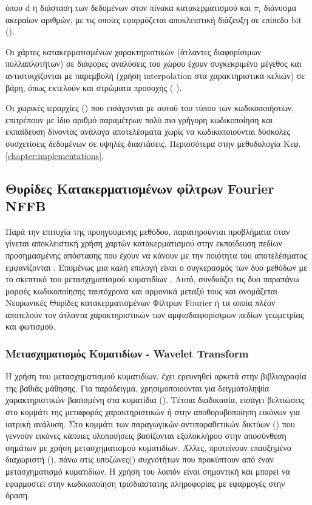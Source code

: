     όπου d η διάσταση των δεδομένων στον πίνακα κατακερματισμού και $\pi_i$ διάνυσμα ακεραίων αριθμών, με τις οποίες εφαρμόζεται αποκλειστική διάζευξη σε επίπεδο bit (). 
\par
    Οι χάρτες κατακερματισμένων χαρακτηριστικών (άτλαντες διαφορίσιμων πολλαπλοτήτων) σε διάφορες αναλύσεις του χώρου έχουν συγκεκριμένο μέγεθος και αντιστοιχίζονται με παρεμβολή (χρήση interpolation στα χαρακτηριστικά κελιών) σε βάρη, όπως εκτελούν και στρώματα προσοχής ( \cite{vaswani2023attention}).
\par 
    Οι χωρικές ιεραρχίες () που εισάγονται με αυτού του τύπου των κωδικοποιήσεων, επιτρέπουν με ίδιο αριθμό παραμέτρων πολύ πιο γρήγορη κωδικοποίηση και εκπαίδευση δίνοντας ανάλογα αποτελέσματα χωρίς να κωδικοποιούνται δύσκολες συσχετίσεις δεδομένων σε υψηλές διαστάσεις. Περισσότερα στην μεθοδολογία Κεφ.\ref{chapter:implementations}.

    
\subsection{ Θυρίδες Κατακερματισμένων φίλτρων Fourier NFFB \cite{wu2023neural}}
    Παρά την επιτυχία της προηγούμενης μεθόδου, παρατηρούνται προβλήματα όταν γίνεται αποκλειστική χρήση χαρτών κατακερματισμού στην εκπαίδευση πεδίων προσημασμένης απόστασης που έχουν να κάνουν με την ποιότητα του αποτελέσματος {εμφανίζονται }. Επομένως μια καλή επιλογή είναι ο συγκερασμός των δύο μεθόδων με το σκεπτικό του μετασχηματισμού κυματιδίων . Αυτό, συνδυάζει τις δυο  παραπάνω μορφές κωδικοποίησης ταυτόχρονα και αρμονικά μεταξύ τους και ονομάζεται Νευρωνικές Θυρίδες κατακερματισμένων Φίλτρων Fourier ή  \cite{wu2023neural} τα οποία πλέον αποτελούν τον άτλαντα χαρακτηριστικών των αμφισδιαφορίσιμων πεδίων γεωμετρίας και φωτισμού. 
    
\subsubsection{Μετασχηματισμός Κυματιδίων - Wavelet Transform}
    Η χρήση του μετασχηματισμού κυματιδίων, έχει ερευνηθεί αρκετά στην βιβλιογραφία της βαθιάς μάθησης. Για παράδειγμα, χρησιμοποιούνται για δειγματοληψία χαρακτηριστικών βασισμένη στα κυματίδια (). Τέτοια διαδικασία, εισάγει βελτιώσεις στο κομμάτι της μεταφοράς χαρακτηριστικών ή στην αποθορυβοποίηση εικόνων για ιατρική ανάλυση. Στο κομμάτι των παραγωγικών-αντιπαραθετικών δικτύων () που γεννούν εικόνες  κάποιες υλοποιήσεις βασίζονται εξολοκλήρου στην αποσύνθεση σημάτων με χρήση μετασχηματισμού κυματιδίων. Άλλες, προτείνουν επαυξημένο διαχωριστή (), πάνω στις υποζώνες() συχνοτήτων που προκύπτουν από έναν μετασχηματισμό κυματιδίων. Η χρήση του λοιπόν είναι σημαντική και μπορεί να εφαρμοστεί στην κωδικοποίηση τρισδιάστατης πληροφορίας με εφαρμογές στην  όραση.
    

